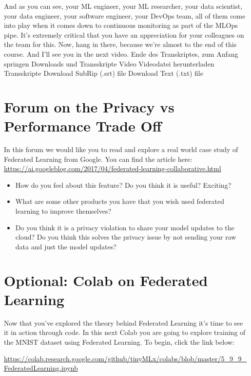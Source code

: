 {{{{{{{{    And as you can see, your ML engineer, your ML researcher,
    your data scientist, your data engineer, your software engineer,
    your DevOps team, all of them come into play
    when it comes down to continuous monitoring as part of the MLOps pipe.
    It's extremely critical that you have an appreciation for your colleagues
    on the team for this.
    Now, hang in there, because we're almost to the end of this course.
    And I'll see you in the next video.
    Ende des Transkriptes, zum Anfang springen
    Downloads und Transskripte
    Video
    Videodatei herunterladen
    Transskripte
    Download SubRip (.srt) file
    Download Text (.txt) file        
        
\section{Forum on the Privacy vs Performance Trade Off}        

In this forum we would like you to read and explore a real world case study of Federated Learning from Google. You can find the article here: \url{https://ai.googleblog.com/2017/04/federated-learning-collaborative.html}

\begin{itemize}
  \item How do you feel about this feature? Do you think it is useful? Exciting? 
  \item What are some other products you have that you wish used federated learning to improve themselves? 
  \item Do you think it is a privacy violation to share your model updates to the cloud? Do you think this solves the privacy issue by not sending your raw data and just the model updates?
\end{itemize}
        
\section{Optional: Colab on Federated Learning}        

Now that you’ve explored the theory behind Federated Learning it's time to see it in action through code. In this next Colab you are going to explore training of the MNIST dataset using Federated Learning. To begin, click the link below:

\url{https://colab.research.google.com/github/tinyMLx/colabs/blob/master/5_9_9_FederatedLearning.ipynb}

        
        
}}}}}}}}

